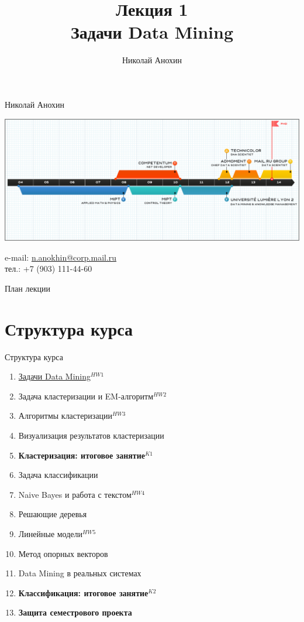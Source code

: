 \documentclass[10pt]{beamer}
\author{Николай Анохин}
\title{\newline \newline \newline Лекция 1 \\ Задачи Data Mining}
\let\otp\titlepage
\renewcommand{\titlepage}{\otp\addtocounter{framenumber}{-1}}
\begin{document}
\begin{frame}[plain]
\titlepage
\end{frame}

\begin{frame}{Николай Анохин}

\begin{center}
\includegraphics[scale=0.325]{images/timeline.png}
\end{center}

\begin{footnotesize}
e-mail: \href{mailto:n.anokhin@corp.mail.ru}{n.anokhin@corp.mail.ru} \\
тел.: +7 (903) 111-44-60
\end{footnotesize}

\end{frame}

\begin{frame}{План лекции}
\tableofcontents
\end{frame}

\section{Структура курса}

\begin{frame}{Структура курса}

{\small
\begin{enumerate}
\item \underline{Задачи Data Mining}{\color{red}$^{HW1}$}
\item Задача кластеризации и EM-алгоритм{\color{red}$^{HW2}$}
\item Алгоритмы кластеризации{\color{red}$^{HW3}$}
\item Визуализация результатов кластеризации
\item \textbf{Кластеризация: итоговое занятие}{\color{red}$^{K1}$}
\item Задача классификации
\item Naive Bayes и работа с текстом{\color{red}$^{HW4}$}
\item Решающие деревья
\item Линейные модели{\color{red}$^{HW5}$}
\item Метод опорных векторов
\item Data Mining в реальных системах
\item \textbf{Классификация: итоговое занятие}{\color{red}$^{K2}$}
\item \textbf{Защита семестрового проекта}
\end{enumerate}
}

\end{frame}
\end{document}
